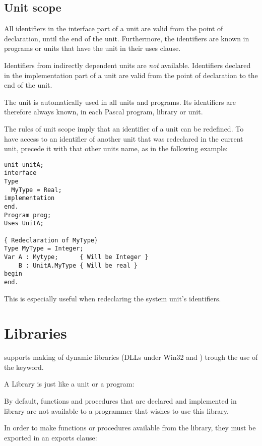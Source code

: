 \subsection{Unit scope}
All identifiers in the interface part of a unit are valid from the point of
declaration, until the end of the unit. Furthermore, the identifiers are
known in programs or units that have the unit in their uses clause.

Identifiers from indirectly dependent units are {\em not} available.
Identifiers declared in the implementation part of a unit are valid from the
point of declaration to the end of the unit.

The  unit is automatically used in all units and programs.
Its identifiers are therefore always known, in each Pascal program, library
or unit.

The rules of unit scope imply that an identifier of a unit can be redefined. 
To have access to an identifier of another unit that was redeclared in
the current unit, precede it with that other units name, as in the following
example:
\begin{verbatim}
unit unitA;
interface
Type
  MyType = Real;
implementation
end.
Program prog;
Uses UnitA;

{ Redeclaration of MyType}
Type MyType = Integer;
Var A : Mytype;      { Will be Integer }
    B : UnitA.MyType { Will be real }
begin
end.
\end{verbatim}
This is especially useful when redeclaring the system unit's identifiers.

\section{Libraries}
 

\fpc supports making of dynamic libraries (DLLs under Win32 and \ostwo) trough
the use of the  keyword.

A Library is just like a unit or a program:


By default, functions and procedures that are declared and implemented in
library are not available to a programmer that wishes to use this library.

In order to make functions or procedures available from the library,
they must be exported in an exports clause:

